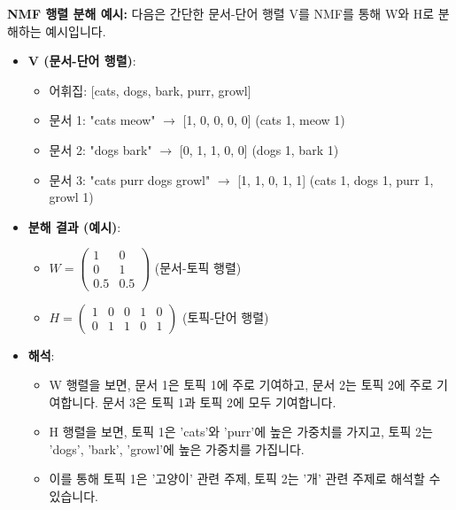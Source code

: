 \documentclass[11pt,a4paper]{article}
\begin{document}
\begin{examplebox}
\textbf{NMF 행렬 분해 예시:}
다음은 간단한 문서-단어 행렬 V를 NMF를 통해 W와 H로 분해하는 예시입니다.
\begin{itemize}
    \item \textbf{V (문서-단어 행렬)}:
    \begin{itemize}
        \item 어휘집: [cats, dogs, bark, purr, growl]
        \item 문서 1: "cats meow" $\rightarrow$ [1, 0, 0, 0, 0] (cats 1, meow 1)
        \item 문서 2: "dogs bark" $\rightarrow$ [0, 1, 1, 0, 0] (dogs 1, bark 1)
        \item 문서 3: "cats purr dogs growl" $\rightarrow$ [1, 1, 0, 1, 1] (cats 1, dogs 1, purr 1, growl 1)
    \end{itemize}
    \item \textbf{분해 결과 (예시)}:
    \begin{itemize}
        \item $W = \begin{pmatrix} 1 & 0 \\ 0 & 1 \\ 0.5 & 0.5 \end{pmatrix}$ (문서-토픽 행렬)
        \item $H = \begin{pmatrix} 1 & 0 & 0 & 1 & 0 \\ 0 & 1 & 1 & 0 & 1 \end{pmatrix}$ (토픽-단어 행렬)
    \end{itemize}
    \item \textbf{해석}:
    \begin{itemize}
        \item W 행렬을 보면, 문서 1은 토픽 1에 주로 기여하고, 문서 2는 토픽 2에 주로 기여합니다. 문서 3은 토픽 1과 토픽 2에 모두 기여합니다.
        \item H 행렬을 보면, 토픽 1은 'cats'와 'purr'에 높은 가중치를 가지고, 토픽 2는 'dogs', 'bark', 'growl'에 높은 가중치를 가집니다.
        \item 이를 통해 토픽 1은 '고양이' 관련 주제, 토픽 2는 '개' 관련 주제로 해석할 수 있습니다.
    \end{itemize}
\end{itemize}
\end{examplebox}
\end{document}
